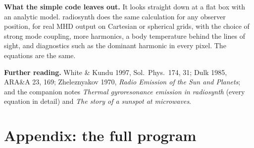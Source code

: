 \documentclass[11pt,a4paper]{article}
\begin{document}
\textbf{What the simple code leaves out.} It looks straight down at a flat box with an analytic
model. \textsf{radiosynth} does the same calculation for any observer position, for real MHD
output on Cartesian or spherical grids, with the choice of strong mode coupling, more
harmonics, a body temperature behind the lines of sight, and diagnostics such as the dominant
harmonic in every pixel. The equations are the same.

{\small\textbf{Further reading.} White \& Kundu 1997, Sol.\ Phys.\ 174, 31; Dulk 1985, ARA\&A 23,
169; Zheleznyakov 1970, \emph{Radio Emission of the Sun and Planets}; and the companion notes
\emph{Thermal gyroresonance emission in radiosynth} (every equation in detail) and \emph{The
story of a sunspot at microwaves}.}

\clearpage
\appendix
\section*{Appendix: the full program}

\end{document}

